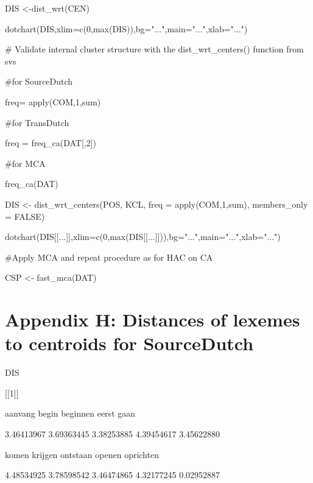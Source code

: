 DIS <-dist\_wrt(CEN)



dotchart(DIS,xlim=c(0,max(DIS)),bg="...",main="...",xlab="...")



\# Validate internal cluster structure with the dist\_wrt\_centers() function from svs



\#for SourceDutch



freq= apply(COM,1,sum)



\#for TransDutch



freq = freq\_ca(DAT[,2])



\#for MCA



freq\_ca(DAT)



DIS <- dist\_wrt\_centers(POS, KCL, freq = apply(COM,1,sum), members\_only = FALSE)



dotchart(DIS[[...]],xlim=c(0,max(DIS[[...]])),bg="...",main="...",xlab="...")



\#Apply MCA and repeat procedure as for HAC on CA



CSP <- fast\_mca(DAT)


\section{Appendix H: Distances of lexemes to centroids for SourceDutch}

DIS



[[1]]



       aanvang          begin       beginnen          eerst           gaan 



    3.46413967     3.69363445     3.38253885     4.39454617     3.45622880 



         komen        krijgen       ontstaan         openen      oprichten 



    4.48534925     3.78598542     3.46474865     4.32177245     0.02952887 



